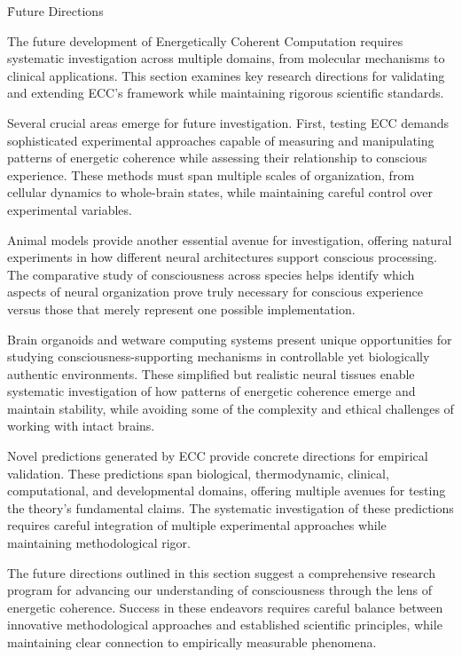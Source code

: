 \h{Future Directions}

The future development of Energetically Coherent Computation requires systematic investigation across multiple domains, from molecular mechanisms to clinical applications. This section examines key research directions for validating and extending ECC's framework while maintaining rigorous scientific standards.

Several crucial areas emerge for future investigation. First, testing ECC demands sophisticated experimental approaches capable of measuring and manipulating patterns of energetic coherence while assessing their relationship to conscious experience. These methods must span multiple scales of organization, from cellular dynamics to whole-brain states, while maintaining careful control over experimental variables.

Animal models provide another essential avenue for investigation, offering natural experiments in how different neural architectures support conscious processing. The comparative study of consciousness across species helps identify which aspects of neural organization prove truly necessary for conscious experience versus those that merely represent one possible implementation.

Brain organoids and wetware computing systems present unique opportunities for studying consciousness-supporting mechanisms in controllable yet biologically authentic environments. These simplified but realistic neural tissues enable systematic investigation of how patterns of energetic coherence emerge and maintain stability, while avoiding some of the complexity and ethical challenges of working with intact brains.

Novel predictions generated by ECC provide concrete directions for empirical validation. These predictions span biological, thermodynamic, clinical, computational, and developmental domains, offering multiple avenues for testing the theory's fundamental claims. The systematic investigation of these predictions requires careful integration of multiple experimental approaches while maintaining methodological rigor.

The future directions outlined in this section suggest a comprehensive research program for advancing our understanding of consciousness through the lens of energetic coherence. Success in these endeavors requires careful balance between innovative methodological approaches and established scientific principles, while maintaining clear connection to empirically measurable phenomena.

